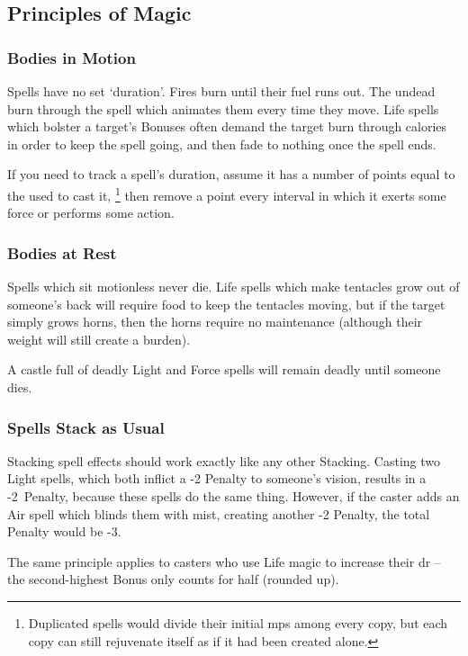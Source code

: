\begin{multicols}{2}
\subsection{Principles of Magic}

\subsubsection{Bodies in Motion}

Spells have no set `duration'.
Fires burn until their fuel runs out.
The undead burn through the spell which animates them every time they move.
Life spells which bolster a target's Bonuses often demand the target burn through calories in order to keep the spell going, and then fade to nothing once the spell ends.

If you need to track a spell's duration, assume it has a number of points equal to the  used to cast it,%
\footnote{Duplicated spells would divide their initial \glspl{mp} among every copy, but each copy can still rejuvenate itself as if it had been created alone.}
then remove a point every \gls{interval} in which it exerts some force or performs some action.

\subsubsection{Bodies at Rest}

Spells which sit motionless never die.
Life spells which make tentacles grow out of someone's back will require food to keep the tentacles moving, but if the target simply grows horns, then the horns require no maintenance (although their \gls{weight} will still create a burden).

A castle full of deadly Light and Force spells will remain deadly until someone dies.

\subsubsection{Spells Stack as Usual}

Stacking spell effects should work exactly like any other Stacking.%
Casting two Light spells, which both inflict a -2 Penalty to someone's vision, results in a -2~Penalty, because these spells do the same thing.
However, if the caster adds an Air spell which blinds them with mist, creating another -2 Penalty, the total Penalty would be -3.

The same principle applies to casters who use Life magic to increase their \gls{dr} -- the second-highest Bonus only counts for half (rounded up).


\end{multicols}
